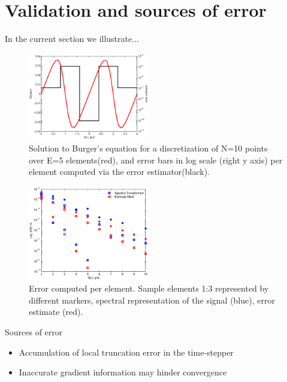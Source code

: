 \documentclass[10pt]{article}
\begin{document}
\section{Validation and sources of error}

In the current section we illustrate...


\begin{figure}[!ht]
\centering
\includegraphics[width=0.47\textwidth]{superpose.eps}
\caption{Solution to Burger's equation for a discretization of N=10 points over E=5 elements(red), and error bars in log scale (right y axis) per element computed via the error estimator(black).}
\end{figure}

\begin{figure}[!ht]
\centering
\includegraphics[width=0.47\textwidth]{specerr.eps}
\caption{Error computed per element. Sample elements 1:3 represented by different markers, spectral representation of the signal (blue), error estimate (red).}
\end{figure}


Sources of error
\begin{itemize}
\item Accumulation of local truncation error in the time-stepper
\item Inaccurate gradient information may hinder convergence


\end{itemize}
\end{document}
